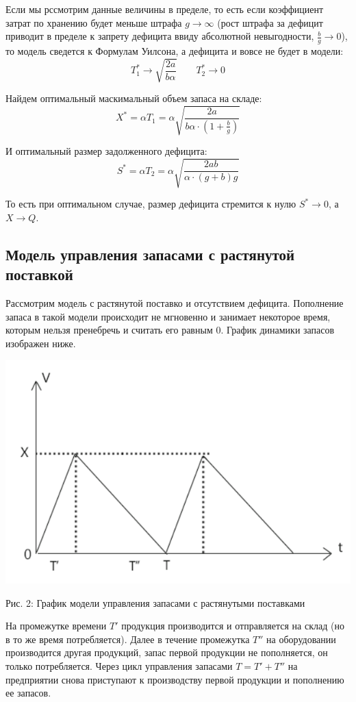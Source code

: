 \documentclass[aps,%
12pt,%
final,%
oneside,
onecolumn,%
musixtex, %
superscriptaddress,%
centertags]{article} %
\theoremstyle{plain}
\theoremstyle{definition}
\theoremstyle{remark}
\begin{document}
Если мы рссмотрим данные величины в пределе, то есть если коэффициент затрат по хранению будет меньше штрафа $g \to \infty$ (рост штрафа за дефицит приводит в пределе к запрету дефицита ввиду абсолютной невыгодности, $\frac{b}{g} \to 0$), то модель сведется к Формулам Уилсона, а дефицита и вовсе не будет в модели:
$$T_1^* \to \sqrt{\frac{2a}{b\alpha }} \qquad T_2^* \to 0$$

Найдем оптимальный маскимальный объем запаса на складе:
$$X^* = \alpha T_1 = \alpha  \sqrt{\frac{2a}{b\alpha \cdot (1+\frac{b}{g})}} $$

И оптимальный размер задолженного дефицита:
$$ S^* = \alpha T_2 = \alpha \sqrt{\frac{2ab}{\alpha \cdot (g+b) g}}$$

То есть при оптимальном случае, размер дефицита стремится к нулю $S^* \to 0$, а $X \to Q$.

\newpage
\subsection{Модель управления запасами с растянутой поставкой}

Рассмотрим модель с растянутой поставко и отсутствием дефицита. Пополнение запаса в такой модели происходит не мгновенно и занимает некоторое время, которым нельзя пренебречь и считать его равным $0$. График динамики запасов изображен ниже.

\begin{center}
  \includegraphics[scale=0.4]{images/2a.png}

  Рис. 2: График модели управления запасами с растянутыми поставками
\end{center}

На промежутке времени $T'$ продукция производится и отправляется на склад (но в то же время потребляется). Далее в течение промежутка $T''$ на оборудовании производится другая продукций, запас первой продукции не пополняется, он только потребляется. Через цикл управления запасами $T=T'+ T''$ на предприятии снова приступают к производству первой продукции и пополнению ее запасов. 
\end{document}
